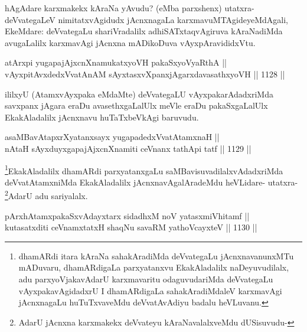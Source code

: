 \begin{artha}
hAgAdare karxmakekx kAraNa yAvudu? (eMba parxshenx) utatxra-deVvategaLeV nimitatxvAgidudx jAcnxnagaLa karxmavuMTAgideyeMdAgali, EkeMdare: deVvategaLu shariVradalilx adhiSATxtaqvAgiruva kAraNadiMda avugaLalilx karxmavAgi jAcnxna mADikoDuva vAyxpAravididxVtu.
\end{artha}


\begin{shl}
atArxpi yugapajAjxcnXnamukatxyoVH pakaSxyoVyaRthA || \\
vAyxpitAvxdedxVvatAnAM sAyxtasxvXpanxjAgarxdavasathxyoVH \hfill || 1128 ||  
\end{shl}

\begin{artha}
ililxyU (AtamxvAyxpaka eMdaMte) deVvategaLU vAyxpakarAdadxriMda savxpanx jAgara eraDu avasethxgaLalUlx meVle eraDu pakaSxgaLalUlx EkakAladalilx jAcnxnavu huTaTxbeVkAgi baruvudu.
\end{artha}


\begin{shl}
asaMBavAtapxrXyatanxsayx yugapadedxVvatAtamxnaH || \\
nAtaH sAyxduyxgapajAjxcnXnamiti ceVnanx tathA\s pi tatf \hfill || 1129 ||  
\end{shl}

\begin{artha}
\footnote{dhamARdi itara kAraNa sahakAradiMda deVvategaLu jAcnxnavanunxMTu mADuvaru, dhamARdigaLa parxyatanxvu EkakAladalilx naDeyuvudilalx, adu parxyoVjakavAdarU karxmavaritu odaguvudariMda deVvategaLu vAyxpakavAgidadxrU I dhamARdigaLa sahakAradiMdaleV karxmavAgi jAcnxnagaLu huTuTxvaveMdu deVvatAvAdiyu badalu heVLuvanu.}EkakAladalilx dhamARdi parxyatanxgaLu saMBavisuvadilalxvAdadxriMda deVvatAtamxniMda EkakAladalilx jAcnxnavAgalAradeMdu heVLidare- utatxra- \footnote{AdarU jAcnxna karxmakekx deVvateyu kAraNavalalxveMdu dUSisuvudu-}AdarU adu sariyalalx.
\end{artha}

\begin{shl}
pArxhA\s \s tamxpakaSxvAdayxtarx sidadhxM noV yatasxmiVhitamf ||  \\
kutasatxditi ceVnamxtatxH shaqNu savaRM yathoVcayxteV \hfill || 1130 ||  
\end{shl}

